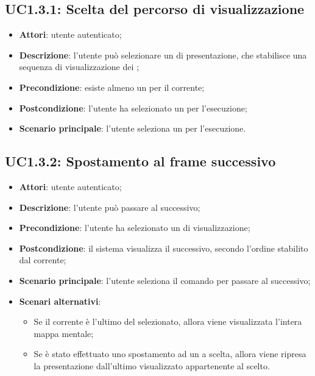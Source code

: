 \subsection{UC1.3.1: Scelta del percorso di visualizzazione}
\label{UC1.3.1}
\begin{itemize}
\item \textbf{Attori}: utente autenticato;
\item \textbf{Descrizione}: l'utente può selezionare un  di presentazione, che stabilisce una sequenza di visualizzazione dei ;
\item \textbf{Precondizione}: esiste almeno un  per il  corrente;
\item \textbf{Postcondizione}: l'utente ha selezionato un  per l'esecuzione;
\item \textbf{Scenario principale}:
l'utente seleziona un  per l'esecuzione.
\end{itemize}
\subsection{UC1.3.2: Spostamento al frame successivo}
\label{UC1.3.2}
\begin{itemize}
\item \textbf{Attori}: utente autenticato;
\item \textbf{Descrizione}: l'utente può passare al  successivo;
\item \textbf{Precondizione}: l'utente ha selezionato un  di visualizzazione;
\item \textbf{Postcondizione}: il sistema visualizza il  successivo, secondo l'ordine stabilito dal  corrente;
\item \textbf{Scenario principale}:
l'utente seleziona il comando per passare al  successivo;
\item \textbf{Scenari alternativi}:
\begin{itemize}
\item Se il  corrente è l'ultimo del  selezionato, allora viene visualizzata l'intera mappa mentale;
\item Se è stato effettuato uno spostamento ad un  a scelta, allora viene ripresa la presentazione dall'ultimo  visualizzato appartenente al  scelto.
\end{itemize}
\end{itemize}
